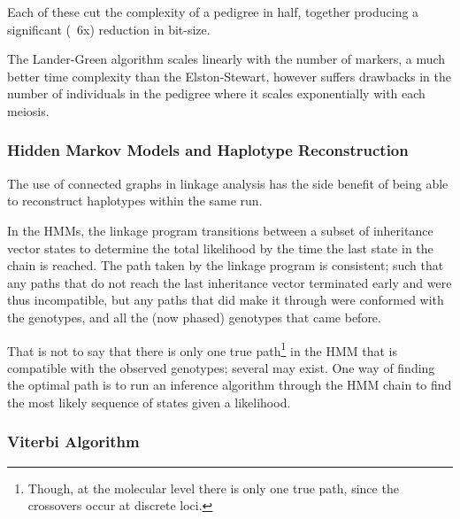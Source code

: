 \begin{description}
\end{description}

Each of these cut the complexity of a pedigree in half, together producing a significant (~6x) reduction in bit-size.

The Lander-Green algorithm scales linearly with the number of markers, a much better time complexity than the Elston-Stewart, however suffers drawbacks in the number of individuals in the pedigree where it scales exponentially with each meiosis.


\subsubsection{Hidden Markov Models and Haplotype Reconstruction}

The use of connected graphs in linkage analysis has the side benefit of being able to reconstruct haplotypes within the same run.

In the HMMs, the linkage program transitions between a subset of inheritance vector states to determine the total likelihood by the time the last state in the chain is reached. The path taken by the linkage program is consistent; such that any paths that do not reach the last inheritance vector terminated early and were thus incompatible, but any paths that did make it through were conformed with the genotypes, and all the (now phased) genotypes that came before.

That is not to say that there is only one true path\footnote{Though, at the molecular level there is only one true path, since the crossovers  occur at discrete loci.} in the HMM that is compatible with the observed genotypes; several may exist.  One way of finding the optimal path is to run an inference algorithm through the HMM chain to find the most likely sequence of states given a likelihood.


\subsubsection{Viterbi Algorithm}


